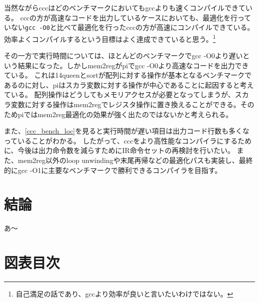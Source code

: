 \documentclass[uplatex,a4paper]{jsarticle}
\begin{document}
当然ながらcccはどのベンチマークにおいてもgccよりも速くコンパイルできている。
cccの方が高速なコードを出力しているケースにおいても、最適化を行っていない\texttt{gcc -O0}と比べて最適化を行ったcccの方が高速にコンパイルできている。
効率よくコンパイルするという目標はよく達成できていると思う。\footnote{自己満足の話であり、gccより効率が良いと言いたいわけではない。}

その一方で実行時間については、ほとんどのベンチマークでgcc -O0より遅いという結果になった。しかしmem2regがpiでgcc -O0より高速なコードを出力できている。
これは14queenとsortが配列に対する操作が基本となるベンチマークであるのに対し、piはスカラ変数に対する操作が中心であることに起因すると考えている。
配列操作はどうしてもメモリアクセスが必要となってしまうが、スカラ変数に対する操作はmem2regでレジスタ操作に置き換えることができる。そのためpiではmem2reg最適化の効果が強く出たのではないかと考えられる。

また、\cref{ccc_bench_loc}を見ると実行時間が遅い項目は出力コード行数も多くなっていることがわかる。
したがって、cccをより高性能なコンパイラにするために、今後は出力命令数を減らすためにIR命令セットの再検討を行いたい。
また、mem2reg以外のloop unwindingや末尾再帰などの最適化パスも実装し、最終的にgcc -O1に主要なベンチマークで勝利できるコンパイラを目指す。

\section{結論}

あ〜

\clearpage
\appendix

\section{図表目次}
\listoffigures
\listofalgorithms
\listoftables



\end{document}
